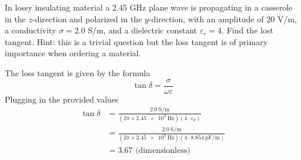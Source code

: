 \documentclass[11pt]{article}
\begin{document}
\pagebreak

\begin{homeworkProblem}

    In lossy insulating material a 2.45 GHz plane wave is propagating in a casserole in the $z$-direction
    and polarized in the $y$-direction, with an amplitude of 20 V/m, a conductivity $\sigma = 2.0$ S/m,
    and a dielectric constant $\varepsilon_r = 4$. Find the lost tangent. Hint: this is a trivial question but the
    loss tangent is of primary importance when ordering a material. \\

    \solution

    The loss tangent is given by the formula
    \[
        \tan \delta = \frac{\sigma}{\omega \varepsilon}
    \]
    Plugging in the provided values
    \begin{align*}
        \tan \delta & = \frac{\qty{2.0}{\siemens/\meter}}{(2\pi \times \qty{2.45e9}{\hertz})(4 \cdot \varepsilon_0)}                   \\
                    & = \frac{\qty{2.0}{\siemens/\meter}}{(2\pi \times \qty{2.45e9}{\hertz})(4 \cdot \qty{8.854}{\pico\farad/\meter})} \\
                    & = 3.67 \text{ (dimensionless)}
    \end{align*}


\end{homeworkProblem}

\pagebreak
\end{document}
